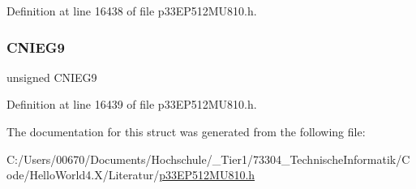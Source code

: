 Definition at line 16438 of file p33\+E\+P512\+M\+U810.\+h.

\mbox{\label{structtag_c_n_e_n_g_b_i_t_s_a464cb610b0f3eda5252047a358616014}} 
\subsubsection{\texorpdfstring{C\+N\+I\+E\+G9}{CNIEG9}}
{\footnotesize\ttfamily unsigned C\+N\+I\+E\+G9}



Definition at line 16439 of file p33\+E\+P512\+M\+U810.\+h.



The documentation for this struct was generated from the following file\+:\begin{DoxyCompactItemize}
\item 
C\+:/\+Users/00670/\+Documents/\+Hochschule/\+\_\+\+Tier1/73304\+\_\+\+Technische\+Informatik/\+Code/\+Hello\+World4.\+X/\+Literatur/\hyperlink{p33_e_p512_m_u810_8h}{p33\+E\+P512\+M\+U810.\+h}\end{DoxyCompactItemize}
